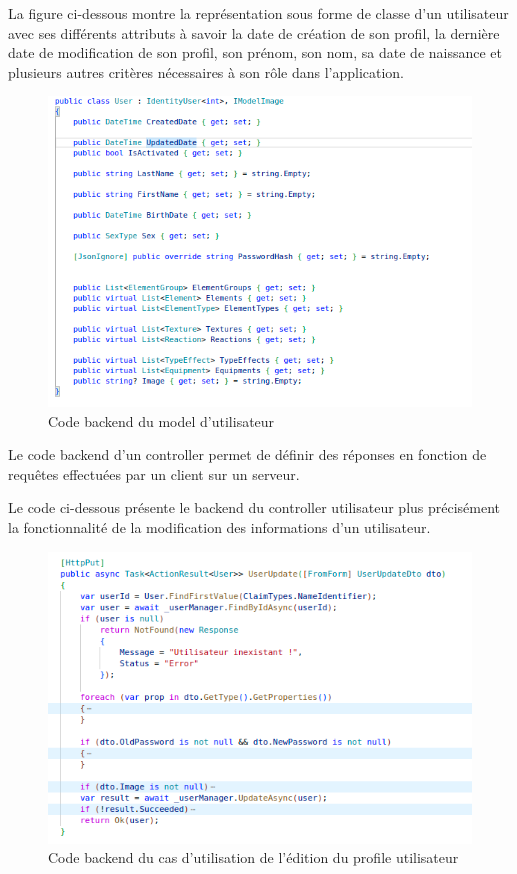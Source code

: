 La figure ci-dessous montre la représentation sous forme de classe d'un utilisateur avec ses différents attributs à savoir la date de création de son profil, la dernière date de modification de son profil, son prénom, son nom, sa date de naissance et plusieurs autres critères nécessaires à son rôle dans l'application.

\begin{figure}[H]
	\centering
	\includegraphics[width=1\textwidth]{img/codeuu}
	\caption{Code backend du model d'utilisateur}
	\label{fig:mesh1}
\end{figure}

Le code backend d'un controller permet de définir des réponses en fonction de requêtes effectuées par un client sur un serveur.

Le code ci-dessous présente le backend du controller utilisateur plus précisément la fonctionnalité de la modification des informations d'un utilisateur.

\begin{figure}[H]
	\centering
	\includegraphics[width=1\textwidth]{img/codeuup}
	\caption{Code backend du cas d'utilisation de l'édition du profile utilisateur}
	\label{fig:mesh1}
\end{figure}

